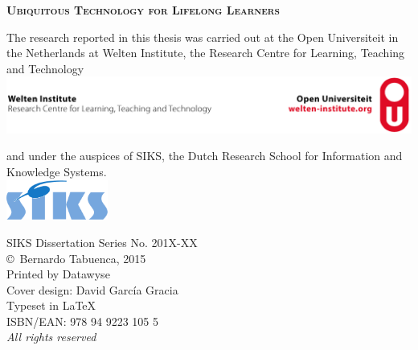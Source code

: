 \documentclass[normalheadings,tablecaptionabove,twoside,openright,chapterprefix,halfparskip,fontsize=10pt,numbers=noenddot]{scrbook} %
\begin{document}

\begin{titlepage}
	\null\vspace*{15.25em}
	\center
	\huge
	\textbf{\textsc{Ubiquitous Technology for Lifelong Learners}}\\
	\vfill\null
	
	\newpage
	\pagestyle{empty}
	\raggedright
	\normalsize
	The research reported in this thesis was carried out at the Open Universiteit in the Netherlands at Welten Institute, the Research Centre for Learning, Teaching and Technology\\
	\vspace*{1em}
	\center
	\includegraphics[width=1\textwidth]{figures/weltenlarge} \\ %
	\vspace*{1em}
	\raggedright
	and under the auspices of SIKS, the Dutch Research School for Information and Knowledge Systems.\\
	\vspace*{1em}
	\center
	\includegraphics[width=0.25\textwidth]{figures/siks-kleur}\\ %
	\vfill
	\raggedright
	SIKS Dissertation Series No. 201X-XX \\
	\vspace*{2em}
	\copyright~Bernardo Tabuenca, 2015\\
	Printed by Datawyse\\
	Cover design: David Garc\'ia Gracia\\
	Typeset in \LaTeX\\
	\vspace*{2em}
	ISBN/EAN: 978 94 9223 105 5\\
	\textit{All rights reserved}
	

\end{titlepage}
\end{document}
